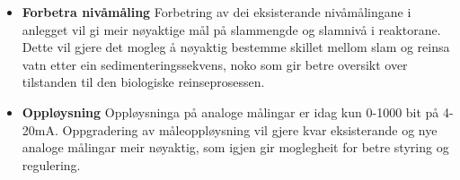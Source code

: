 \begin{itemize}
    \item \textbf{Forbetra nivåmåling} \newline
        Forbetring av dei eksisterande nivåmålingane i anlegget vil gi meir nøyaktige mål på slammengde og slamnivå i reaktorane.
        Dette vil gjere det mogleg å nøyaktig bestemme skillet mellom slam og reinsa vatn etter ein sedimenteringssekvens,
        noko som gir betre oversikt over tilstanden til den biologiske reinseprosessen.
    \item \textbf{Oppløysning} \newline
        Oppløysninga på analoge målingar er idag kun 0-1000 bit på 4-20mA. \newline
        Oppgradering av måleoppløysning vil gjere kvar eksisterande og nye analoge målingar
        meir nøyaktig, som igjen gir moglegheit for betre styring og regulering.
\end{itemize}
\newpage


